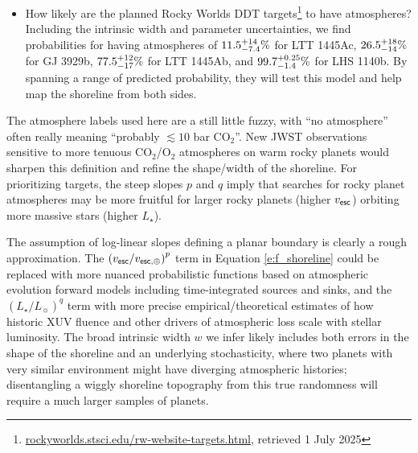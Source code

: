 \documentclass[modern,linenumbers,trackchanges]{aastex7}
\begin{document}
\begin{itemize}
\item How likely are the planned Rocky Worlds DDT targets\footnote{\href{https://rockyworlds.stsci.edu/rw-website-targets.html}{rockyworlds.stsci.edu/rw-website-targets.html}, retrieved 1 July 2025} to have atmospheres? Including the intrinsic width and parameter uncertainties, we find probabilities for having atmospheres of $11.5_{-7.4}^{+14}\%$ for LTT 1445Ac, $26.5_{-14}^{+18}\%$ for  GJ 3929b, $77.5_{-17}^{+12}\%$ for LTT 1445Ab, and $99.7_{-1.4}^{+0.25}\%$ for LHS 1140b. By spanning a range of predicted probability, they will test this model and help map the shoreline from both sides.
\end{itemize}

The atmosphere labels used here are a still little fuzzy, with ``no atmosphere'' often really meaning ``probably $\lesssim 10$ bar CO$_2$''. New JWST observations sensitive to more tenuous CO$_2$/O$_2$ atmospheres on warm rocky planets would sharpen this definition and refine the shape/width of the shoreline. For prioritizing targets, the steep slopes $p$ and $q$ imply that searches for rocky planet atmospheres may be more fruitful for larger rocky planets (higher $v_{\sf esc}$) orbiting more massive stars (higher $L_\star$). 

The assumption of log-linear slopes defining a planar boundary is clearly a rough approximation. The $\left(v_{\sf esc}/v_{\sf esc, \oplus}\right)^p$ term in Equation \ref{e:f_shoreline} could be replaced with more nuanced probabilistic functions based on atmospheric evolution forward models including time-integrated sources and sinks, and the $\left(L_\star/L_\sun\right)^q$ term with more precise empirical/theoretical estimates of how historic XUV fluence and other drivers of atmospheric loss scale with stellar luminosity. The broad intrinsic width $w$ we infer likely includes both errors in the shape of the shoreline and an underlying stochasticity, where two planets with very similar environment might have diverging atmospheric histories; disentangling a wiggly shoreline topography from this true randomness will require a much larger samples of planets. 
\end{document}
